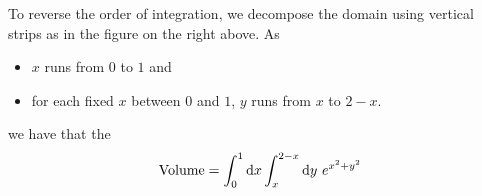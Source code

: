\begin{solution}
\begin{center}
\end{center}
To reverse the order of integration, we decompose the domain using vertical
strips as in the figure on the right above. As
\begin{itemize}
\item
$x$ runs from $0$ to $1$ and
\item
for each fixed $x$ between $0$ and $1$, $y$ runs from $x$ to $2-x$.
\end{itemize}
we have that the
\begin{equation*}
\text{Volume}=\int_0^1 \mathrm{d}x\int_x^{2-x}\mathrm{d}y\ e^{x^2+y^2}
\end{equation*}
\end{solution}

